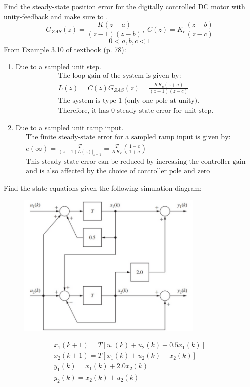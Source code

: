 \documentclass[12pt]{article}
\newenvironment{problem}[2][Problem]{\begin{trivlist}
\item[\hskip \labelsep {\bfseries #1}\hskip \labelsep {\bfseries #2.}]}{\end{trivlist}}
\begin{document}
\begin{problem}{2}
    Find the steady-state position error for the digitally controlled DC motor with unity-feedback and make sure to .
    $$G_{ZAS}(z)=\frac{K(z+a)}{(z-1)(z-b)},\;C(z) = K_c\frac{(z-b)}{(z-c)}$$
    $$0<a,b,c<1$$
    From Example 3.10 of textbook (p. 78):
    \begin{enumerate}[label=(\alph*)]
        \item Due to a sampled unit step.
        \begin{align*}
            \text{The loop gain of the system is given by:}\\
            L(z) = C(z)G_{ZAS}(z)=\frac{KK_c(z+a)}{(z-1)(z-c)}\\
            \text{The system is type 1 (only one pole at unity)}.\\
            \text{Therefore, it has 0 steady-state error for unit step.}
        \end{align*}
        \item Due to a sampled unit ramp input.
        \begin{align*}
            \text{The finite steady-state error for a sampled ramp input is given by:}\\
            e(\infty) = \frac{T}{(z-1)L(z)|_{z=1}}=\frac{T}{KK_c}\left(\frac{1-c}{1+a}\right)\\
            \text{This steady-state error can be reduced by increasing the controller gain}\\ 
            \text{and is also affected by the choice of controller pole and zero}
        \end{align*}
    \end{enumerate}
\end{problem}
\pagebreak
\begin{problem}{3}
    Find the state equations given the following simulation diagram:
    \begin{figure}[h]
        \centering
        \includegraphics[width=0.8\textwidth]{p3}
    \end{figure}
    \begin{align*}
        x_1(k+1) = T[u_1(k)+u_2(k)+0.5x_1(k)]\\
        x_2(k+1) = T[x_1(k)+u_2(k)-x_2(k)]\\
        y_1(k) = x_1(k)+2.0x_2(k)\\
        y_2(k) = x_2(k)+u_2(k)
    \end{align*}
\end{problem}
\end{document}
